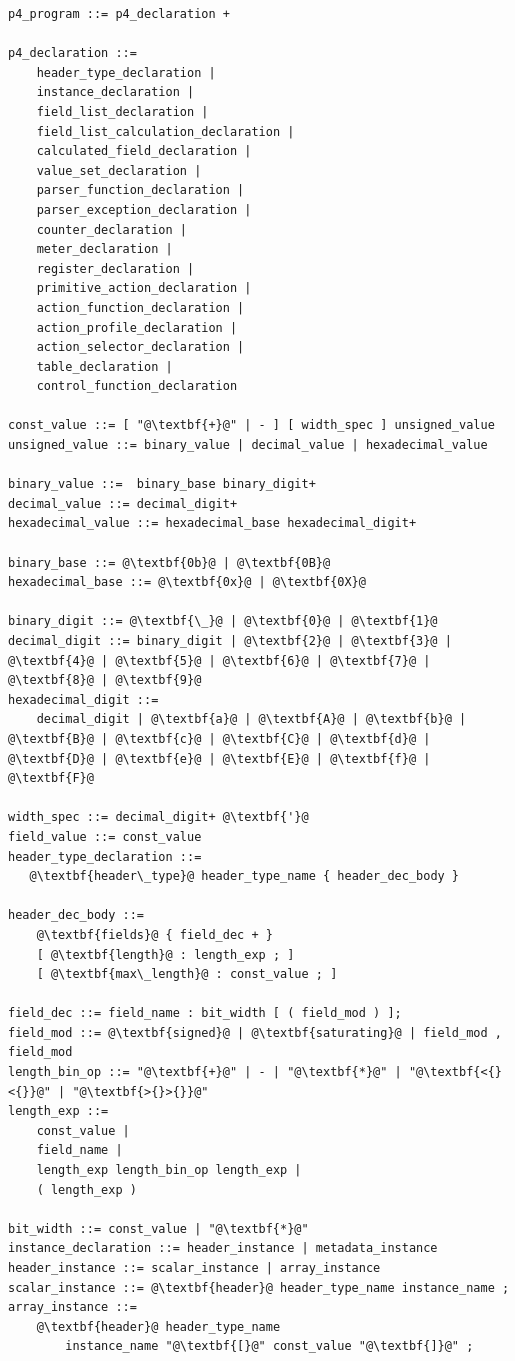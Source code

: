 \documentclass[12pt]{article}
\begin{document}
\begin{lstlisting}[frame=single,backgroundcolor=\color{bnfgreen},escapechar=\@]
p4_program ::= p4_declaration +

p4_declaration ::=
    header_type_declaration | 
    instance_declaration |
    field_list_declaration |
    field_list_calculation_declaration |
    calculated_field_declaration |
    value_set_declaration |
    parser_function_declaration |
    parser_exception_declaration |
    counter_declaration |
    meter_declaration |
    register_declaration |
    primitive_action_declaration |
    action_function_declaration |
    action_profile_declaration |
    action_selector_declaration |
    table_declaration |
    control_function_declaration

const_value ::= [ "@\textbf{+}@" | - ] [ width_spec ] unsigned_value
unsigned_value ::= binary_value | decimal_value | hexadecimal_value

binary_value ::=  binary_base binary_digit+
decimal_value ::= decimal_digit+
hexadecimal_value ::= hexadecimal_base hexadecimal_digit+

binary_base ::= @\textbf{0b}@ | @\textbf{0B}@
hexadecimal_base ::= @\textbf{0x}@ | @\textbf{0X}@

binary_digit ::= @\textbf{\_}@ | @\textbf{0}@ | @\textbf{1}@
decimal_digit ::= binary_digit | @\textbf{2}@ | @\textbf{3}@ | @\textbf{4}@ | @\textbf{5}@ | @\textbf{6}@ | @\textbf{7}@ | @\textbf{8}@ | @\textbf{9}@
hexadecimal_digit ::= 
    decimal_digit | @\textbf{a}@ | @\textbf{A}@ | @\textbf{b}@ | @\textbf{B}@ | @\textbf{c}@ | @\textbf{C}@ | @\textbf{d}@ | @\textbf{D}@ | @\textbf{e}@ | @\textbf{E}@ | @\textbf{f}@ | @\textbf{F}@

width_spec ::= decimal_digit+ @\textbf{'}@
field_value ::= const_value
header_type_declaration ::= 
   @\textbf{header\_type}@ header_type_name { header_dec_body }

header_dec_body ::=
    @\textbf{fields}@ { field_dec + }
    [ @\textbf{length}@ : length_exp ; ]
    [ @\textbf{max\_length}@ : const_value ; ]

field_dec ::= field_name : bit_width [ ( field_mod ) ];
field_mod ::= @\textbf{signed}@ | @\textbf{saturating}@ | field_mod , field_mod
length_bin_op ::= "@\textbf{+}@" | - | "@\textbf{*}@" | "@\textbf{<{}<{}}@" | "@\textbf{>{}>{}}@"
length_exp ::=
    const_value |
    field_name |
    length_exp length_bin_op length_exp |
    ( length_exp )

bit_width ::= const_value | "@\textbf{*}@"
instance_declaration ::= header_instance | metadata_instance
header_instance ::= scalar_instance | array_instance
scalar_instance ::= @\textbf{header}@ header_type_name instance_name ;
array_instance ::=
    @\textbf{header}@ header_type_name 
        instance_name "@\textbf{[}@" const_value "@\textbf{]}@" ;


\end{lstlisting}
\end{document}
